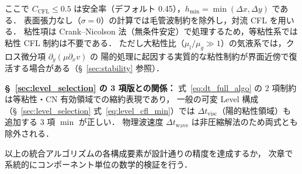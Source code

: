 ここで $C_{\mathrm{CFL}} \le 0.5$ は安全率（デフォルト 0.45），$h_{\min} = \min(\Delta x, \Delta y)$ である．
表面張力なし（$\sigma=0$）の計算では毛管波制約を除外し，対流 CFL を用いる．
粘性項は Crank--Nicolson 法（無条件安定）で処理するため，等粘性系では粘性 CFL 制約は不要である．
ただし大粘性比（$\mu_l/\mu_g \gg 1$）の気液系では，クロス微分項 $\partial_y(\mu\partial_x v)$ の
陽的処理に起因する実質的な粘性制約が界面近傍で復活する場合がある（§~\ref{sec:stability} 参照）．

\noindent\textbf{§~\ref{sec:level_selection} の 3 項版との関係：}
式~\eqref{eq:dt_full_algo} の 2 項制約は等粘性・CN 有効領域での縮約表現であり，
一般の可変 Level 構成（§~\ref{sec:level_selection} 式~\eqref{eq:level_cfl_min}）では
$\Delta t_\text{visc}$（陽的粘性領域）も追加する 3 項 $\min$ が正しい．
物理波速度 $\Delta t_\text{wave}$ は非圧縮解法のため両式とも除外される．

\bigskip
以上の統合アルゴリズムの各構成要素が設計通りの精度を達成するか，
次章で系統的にコンポーネント単位の数学的検証を行う．
